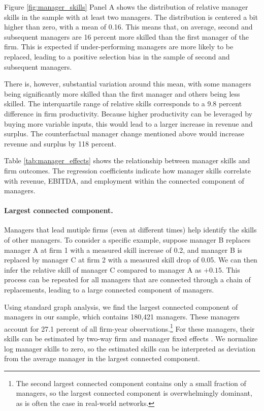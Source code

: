 \documentclass[11pt,a4paper]{article}
\begin{document}
Figure \ref{fig:manager_skills} Panel A shows the distribution of relative manager skills in the sample with at least two managers. The distribution is centered a bit higher than zero, with a mean of 0.16. This means that, on average, second and subsequent managers are 16 percent more skilled than the first manager of the firm. This is expected if under-performing managers are more likely to be replaced, leading to a positive selection bias in the sample of second and subsequent managers. 

There is, however, substantial variation around this mean, with some managers being significantly more skilled than the first manager and others being less skilled. The interquartile range of relative skills corresponds to a 9.8 percent difference in firm productivity. Because higher productivity can be leveraged by buying more variable inputs, this would lead to a larger increase in revenue and surplus. The counterfactual manager change mentioned above would increase revenue and surplus by 118 percent.

Table \ref{tab:manager_effects} shows the relationship between manager skills and firm outcomes. The regression coefficients indicate how manager skills correlate with revenue, EBITDA, and employment within the connected component of managers.

\paragraph{Largest connected component.}
Managers that lead mutiple firms (even at different times) help identify the skills of other managers. To consider a specific example, suppose manager B replaces manager A at firm 1 with a measured skill increase of 0.2, and manager B is replaced by manager C at firm 2 with a measured skill drop of 0.05. We can then infer the relative skill of manager C compared to manager A as $+0.15$. This process can be repeated for all managers that are connected through a chain of replacements, leading to a large connected component of managers.

Using standard graph analysis, we find the largest connected component of managers in our sample, which contains 180,421 managers. These managers account for 27.1 percent of all firm-year observations.\footnote{The second largest connected component contains only a small fraction of managers, so the largest connected component is overwhelmingly dominant, as is often the case in real-world networks.} For these managers, their skills can be estimated by two-way firm and manager fixed effects \citep{Abowd1999Econometrica,reghdfe}. We normalize log manager skills to zero, so the estimated skills can be interpreted as deviation from the average manager in the largest connected component. 
\end{document}
